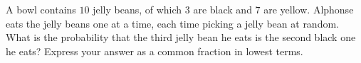 A bowl contains $10$ jelly beans, of which $3$ are black and $7$ are yellow. Alphonse eats the jelly beans one at a time, each time picking a jelly bean at random. What is the probability that the third jelly bean he eats is the second black one he eats? Express your answer as a common fraction in lowest terms.

